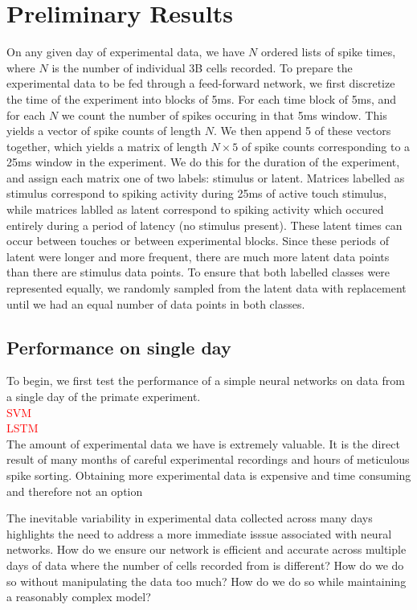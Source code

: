 \documentclass[12pt]{article}
\begin{document}
\section{Preliminary Results}
On any given day of experimental data, we have $N$ ordered lists of spike times, where $N$ is the number of individual 3B cells recorded. To prepare the experimental data to be fed through a feed-forward network, we first discretize the time of the experiment into blocks of 5ms. For each time block of 5ms, and for each $N$ we count the number of spikes occuring in that 5ms window. This yields a vector of spike counts of length $N$. We then append 5 of these vectors together, which yields a matrix of length $N\times5$ of spike counts corresponding to a 25ms window in the experiment. We do this for the duration of the experiment, and assign each matrix one of two labels: stimulus or latent. Matrices labelled as stimulus correspond to spiking activity during 25ms of active touch stimulus, while matrices lablled as latent correspond to spiking activity which occured entirely during a period of latency (no stimulus present). These latent times can occur between touches or between experimental blocks. Since these periods of latent were longer and more frequent, there are much more latent data points than there are stimulus data points. To ensure that both labelled classes were represented equally, we randomly sampled from the latent data with replacement until we had an equal number of data points in both classes.
\subsection{Performance on single day}
To begin, we first test the performance of a simple neural networks on data from a single day of the primate experiment.\\
\textcolor{red}{SVM}\\
\textcolor{red}{LSTM}\\
The amount of experimental data we have is extremely valuable. It is the direct result of many months of careful experimental recordings and hours of meticulous spike sorting. Obtaining more experimental data is expensive and time consuming and therefore not an option

The inevitable variability in experimental data collected across many days highlights  the need to address a more immediate isssue associated with neural networks.
How do we ensure our network is efficient and accurate across multiple days of data where the number of cells recorded from is different? How do we do so without manipulating the data too much? How do we do so while maintaining a reasonably complex model?
\end{document}
